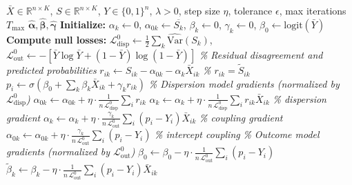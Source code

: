 \documentclass[referee,lineno,pdflatex,sn-vancouver-num]{sn-jnl}
\begin{document}

\begin{algorithm}[h]
\caption{PRIMED: Proximal Gradient Descent with Selective Penalization}\label{alg:primed}
\begin{algorithmic}[1]
\Require $\bar X \in \mathbb{R}^{n \times K}$, $S \in \mathbb{R}^{n \times K}$, $Y \in \{0,1\}^n$, $\lambda > 0$, step size $\eta$, tolerance $\epsilon$, max iterations $T_{\max}$
\Ensure $\hat{\boldsymbol{\alpha}}, \hat{\boldsymbol{\beta}}, \hat{\boldsymbol{\gamma}}$
\Statex
\State \textbf{Initialize:} $\alpha_k \gets 0$, $\alpha_{0k} \gets \overline{S_k}$, $\beta_k \gets 0$, $\gamma_k \gets 0$, $\beta_0 \gets \mathrm{logit}(\bar Y)$
\State \textbf{Compute null losses:} $\mathcal{L}_{\mathrm{disp}}^0 \gets \tfrac{1}{2}\textstyle\sum_k \widehat{\mathrm{Var}}(S_k)$, \; $\mathcal{L}_{\mathrm{out}}^0 \gets -[\bar Y \log \bar Y + (1{-}\bar Y)\log(1{-}\bar Y)]$
\Statex
{}
  \Statex \quad \textit{\% Residual disagreement and predicted probabilities}
    \State $r_{ik} \gets S_{ik} - \alpha_{0k} - \alpha_k \bar X_{ik}$ \hfill \textit{\% $r_{ik} = \tilde S_{ik}$}
  \EndFor
    \State $p_i \gets \sigma(\beta_0 + \textstyle\sum_k \beta_k \bar X_{ik} + \gamma_k r_{ik})$
  \EndFor
  \Statex \quad \textit{\% Dispersion model gradients (normalized by $\mathcal{L}_{\mathrm{disp}}^0$)}
    \State $\alpha_{0k} \gets \alpha_{0k} + \eta \cdot \tfrac{1}{n \, \mathcal{L}_{\mathrm{disp}}^0} \textstyle\sum_i r_{ik}$
    \State $\alpha_k \gets \alpha_k + \eta \cdot \tfrac{1}{n \, \mathcal{L}_{\mathrm{disp}}^0} \textstyle\sum_i r_{ik} \bar X_{ik}$ \hfill \textit{\% dispersion gradient}
    \State $\alpha_k \gets \alpha_k + \eta \cdot \tfrac{\gamma_k}{n \, \mathcal{L}_{\mathrm{out}}^0} \textstyle\sum_i (p_i - Y_i) \bar X_{ik}$ \hfill \textit{\% coupling gradient}
    \State $\alpha_{0k} \gets \alpha_{0k} + \eta \cdot \tfrac{\gamma_k}{n \, \mathcal{L}_{\mathrm{out}}^0} \textstyle\sum_i (p_i - Y_i)$ \hfill \textit{\% intercept coupling}
  \EndFor
  \Statex \quad \textit{\% Outcome model gradients (normalized by $\mathcal{L}_{\mathrm{out}}^0$)}
  \State $\beta_0 \gets \beta_0 - \eta \cdot \tfrac{1}{n \, \mathcal{L}_{\mathrm{out}}^0} \textstyle\sum_i (p_i - Y_i)$
    \State $\tilde\beta_k \gets \beta_k - \eta \cdot \tfrac{1}{n \, \mathcal{L}_{\mathrm{out}}^0} \textstyle\sum_i (p_i - Y_i)\bar X_{ik}$

\end{algorithmic}
\end{algorithm}
\end{document}
